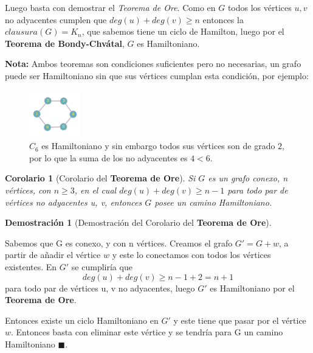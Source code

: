 \documentclass[a4paper,1pt]{report}
\newtheorem*{cor}{Corolario}
\newtheorem*{dem}{Demostración}
\begin{document}
Luego basta con demostrar el \textit{Teorema de Ore}. Como en $G$ todos los v\'ertices $u,v$ no adyacentes cumplen que $deg(u) + deg(v) \geq n$ entonces la $clausura(G) = K_n$, que sabemos tiene un ciclo de Hamilton, luego por el \textbf{Teorema de Bondy-Chvátal}, $G$ es Hamiltoniano.

\textbf{Nota:} Ambos teoremas son condiciones suficientes pero no necesarias, un grafo puede ser Hamiltoniano sin que sus v\'ertices cumplan esta condici\'on, por ejemplo:

\begin{figure}[H]
    \centering
    \includegraphics[width=0.2\textwidth]{figures4/C6.png}
    \caption{$C_6$ es Hamiltoniano y sin embargo todos sus v\'ertices son de grado $2$, por lo que la suma de los no adyacentes es $4 < 6$.}
\end{figure} 

\begin{cor}[Corolario del \textbf{Teorema de Ore}]
    Si $G$ es un grafo conexo, n vértices, con $n\geq 3$, en el cual $deg(u)+deg(v)\geq n - 1$ para todo par de vértices no adyacentes u, v, entonces $G$ posee un camino Hamiltoniano.
  \end{cor}
  
  \begin{dem}[Demostración del Corolario del \textbf{Teorema de Ore}]\end{dem}
  
  Sabemos que G es conexo, y con n vértices.
  Creamos el grafo $G' = G + w$, a partir de añadir el vértice $w$ y este lo conectamos con todos los vértices existentes.
  En $G'$ se cumpliría que $$deg(u)+deg(v)\geq n - 1 + 2 = n + 1$$ para todo par de vértices u, v no adyacentes,
  luego $G'$ es Hamiltoniano por el \textbf{Teorema de Ore}.
  
  Entonces existe un ciclo Hamiltoniano en $G'$ y este tiene que pasar por el vértice $w$. Entonces basta con eliminar este vértice y se tendría para G un camino Hamiltoniano $\blacksquare$.
  
\end{document}
